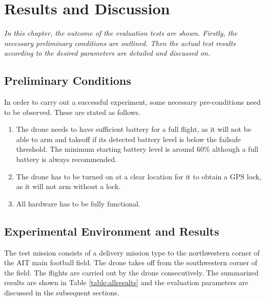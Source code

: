 \setlength{\footskip}{8mm}

\chapter{Results and Discussion}
\label{ch:results}

\textit{In this chapter, the outcome of the evaluation tests are shown. Firstly, the necessary preliminary conditions are outlined. Then the actual test results according to the desired parameters are detailed and discussed on.}

\section{Preliminary Conditions}
\label{sect:preconditions}
In order to carry out a successful experiment, some necessary pre-conditions need to be observed. These are stated as follows.

\begin{enumerate}
  \item The drone needs to have sufficient battery for a full flight, as it will not be able to arm and takeoff if its detected battery level is below the failsafe threshold. The minimum starting battery level is around 60\% although a full battery is always recommended.
  \item The drone has to be turned on at a clear location for it to obtain a GPS lock, as it will not arm without a lock.
  \item All hardware has to be fully functional.
\end{enumerate}

\section{Experimental Environment and Results}
The test mission consists of a delivery mission type to the northwestern corner of the AIT main football field. The drone takes off from the southwestern corner of the field. The flights are carried out by the drone consecutively. The summarized results are shown in Table \ref{table:allresults} and the evaluation parameters are discussed in the subsequent sections.

